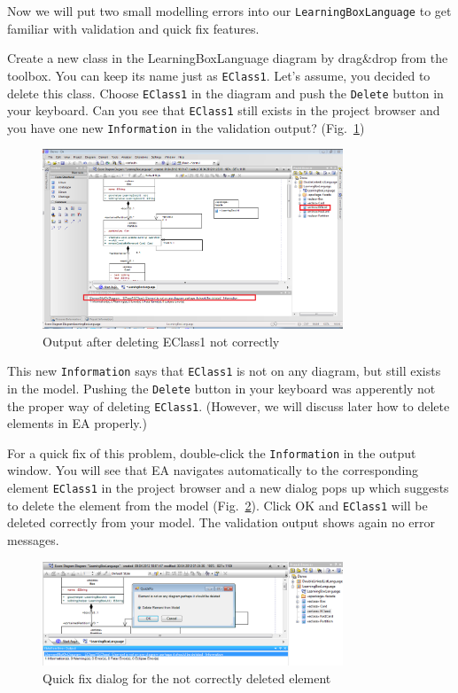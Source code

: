 Now we will put two small modelling errors into our \texttt{LearningBoxLanguage}
to get familiar with validation and quick fix features.

Create a new class in the LearningBoxLanguage diagram by drag\&drop from the
toolbox. You can keep its name just as \texttt{EClass1}. Let's assume, you
decided to delete this class. Choose \texttt{EClass1} in the diagram and push the
\texttt{Delete} button in your keyboard. Can you see that \texttt{EClass1} still
exists in the project browser and you have one new \texttt{Information} in the
validation output? (Fig.~\ref{fig:validation_information})

\begin{figure}[htbp]
	\centering 
  \includegraphics[width=0.8\textwidth]{pics/memBoxBilder/memBox43} 
	\caption{Output after deleting EClass1 not correctly}
	\label{fig:validation_information}
\end{figure}

This new \texttt{Information} says that \texttt{EClass1} is not on any diagram, but still
exists in the model. Pushing the \texttt{Delete} button in your keyboard was
apperently not the proper way of deleting \texttt{EClass1}. (However, we will
discuss later how to delete elements in EA properly.)

For a quick fix of this problem, double-click the \texttt{Information} in the
output window. You will see that EA navigates automatically to the
corresponding element \texttt{EClass1} in the project browser and a new dialog
pops up which suggests to delete the element from the model
(Fig.~\ref{fig:quick-fix1}).
Click OK and \texttt{EClass1} will be deleted correctly from your model. The validation output
shows again no error messages.

\begin{figure}[htbp]
	\centering 
  \includegraphics[width=0.8\textwidth]{pics/memBoxBilder/memBox45} 
	\caption{Quick fix dialog for the not correctly deleted element}
	\label{fig:quick-fix1}
\end{figure}

